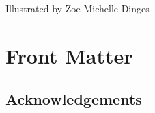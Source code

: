 \documentclass[
  letterpaper,
]{book}
\renewcommand*\contentsname{Table of contents}
\newcommand\contentsname{Table of contents}
\begin{document}
\begin{frontmatter}
\begin{titlepage}
{\vspace{1pt}
}

\newcommand{\dateblock}{{\titlepagedateblock}

\vspace{0pt}
}

\newcommand{\headerblock}{}

\thispagestyle{empty} %


\newlength{\minipagewidth}
\setlength{\minipagewidth}{\textwidth}
\raggedright %
\begin{minipage}[b][\textheight][s]{\minipagewidth}
\titlepagepagealign
\titleblock

\authorblock

\Large Illustrated by Zoe Michelle Dinges

\vfill

\logoblock

\footerblock
\par

\end{minipage}
\clearpage
\restoregeometry
\end{titlepage}
\setcounter{page}{1}
\end{frontmatter}


\renewcommand*\contentsname{Contents}
{
\setcounter{tocdepth}{2}
\tableofcontents
}
\listoffigures
\listoftables
\mainmatter
{}

\chapter*{Front Matter}\label{front-matter}


\section*{Acknowledgements}\label{acknowledgements}

\end{document}
